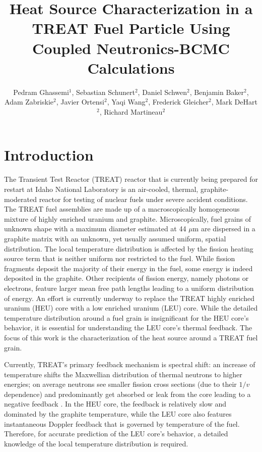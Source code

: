 \documentclass{anstrans}
\title{Heat Source Characterization in a TREAT Fuel Particle Using Coupled Neutronics-BCMC Calculations}
\author{Pedram Ghassemi$^1$, Sebastian Schunert$^2$, Daniel Schwen$^2$, Benjamin Baker$^2$, Adam Zabriskie$^2$, Javier Ortensi$^2$, Yaqi Wang$^2$, Frederick Gleicher$^2$, Mark DeHart$^2$, Richard Martineau$^2$}
\institute{$^1$Department of Nuclear Engineering, North Carolina State University, Raleigh, NC\\
               $^2$Idaho National Laboratory, Nuclear Science \&Technology Directorate, Idaho National Laboratory, Idaho Falls, ID}
\begin{document}
\section{Introduction}
The Transient Test Reactor (TREAT) reactor that is currently being prepared for restart at Idaho National Laboratory \cite{treat} is an air-cooled, thermal, graphite-moderated reactor for testing of nuclear fuels under severe accident conditions. The TREAT fuel assemblies are made up of a macroscopically homogeneous mixture of highly enriched uranium and graphite. Microscopically, fuel grains of unknown shape with a maximum diameter estimated at 44 $\mu$m \cite{Mo2015} are dispersed in a graphite matrix with an unknown, yet usually assumed uniform, spatial distribution. The local temperature distribution is affected by the fission heating source term that is neither uniform nor restricted to the fuel. While fission fragments deposit the majority of their energy in the fuel, some energy is indeed deposited in the graphite. Other recipients of fission energy, namely photons or electrons, feature larger mean free path lengths leading to a uniform distribution of energy. An effort is currently underway to replace the TREAT highly enriched uranium (HEU) core with a low enriched uranium (LEU) core. While the detailed temperature distribution around a fuel grain is insignificant for the HEU core's behavior, it is essential for understanding the LEU core's thermal feedback. The focus of this work is the characterization of the heat source around a TREAT fuel grain.

Currently, TREAT's primary feedback mechanism is spectral shift: an increase of temperature shifts the Maxwellian distribution of thermal neutrons to higher energies; on average neutrons see smaller fission cross sections (due to their $1/v$ dependence) and predominantly get absorbed or leak from the core leading to a negative feedback \cite{TreatFeedback}. In the HEU core, the feedback is relatively slow and dominated by the graphite temperature, while the LEU core also features instantaneous Doppler feedback that is governed by temperature of the fuel. Therefore, for accurate prediction of the LEU core's behavior, a detailed knowledge of the local temperature distribution is required.
\end{document}
